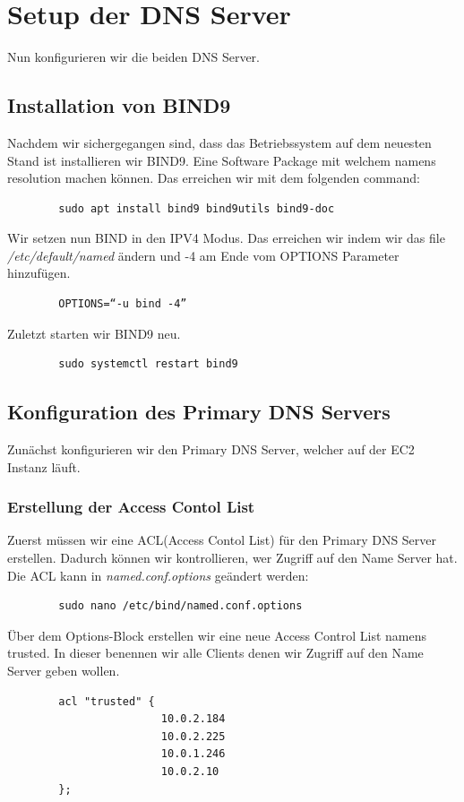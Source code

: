 \documentclass[a4paper,12pt]{article}
\begin{document}
\section{Setup der DNS Server}
Nun konfigurieren wir die beiden DNS Server.
\subsection{Installation von BIND9}
Nachdem wir sichergegangen sind, dass das Betriebssystem auf dem neuesten Stand ist installieren wir BIND9. 
Eine Software Package mit welchem namens resolution machen können. Das erreichen wir mit dem folgenden command:
\begin{verbatim}
		sudo apt install bind9 bind9utils bind9-doc
\end{verbatim}

Wir setzen nun BIND in den IPV4 Modus. Das erreichen wir indem wir das file \textit{/etc/default/named} ändern und -4 am Ende vom OPTIONS Parameter hinzufügen.
\begin{verbatim}
		OPTIONS=“-u bind -4”
\end{verbatim}
Zuletzt starten wir BIND9 neu.
\begin{verbatim}
		sudo systemctl restart bind9
\end{verbatim}



\subsection{Konfiguration des Primary DNS Servers}
Zunächst konfigurieren wir den Primary DNS Server, welcher auf der EC2 Instanz läuft.

\subsubsection{Erstellung der Access Contol List}
Zuerst müssen wir eine ACL(Access Contol List) für den Primary DNS Server erstellen. Dadurch können wir kontrollieren, wer Zugriff auf den Name Server hat.
Die ACL kann in \textit{named.conf.options} geändert werden:
\begin{verbatim}
		sudo nano /etc/bind/named.conf.options
\end{verbatim}


Über dem Options-Block erstellen wir eine neue Access Control List namens trusted.
In dieser benennen wir alle Clients denen wir Zugriff auf den Name Server geben wollen.
\begin{verbatim}
		acl "trusted" {
						10.0.2.184
						10.0.2.225
						10.0.1.246
						10.0.2.10
		};
\end{verbatim}
\end{document}
